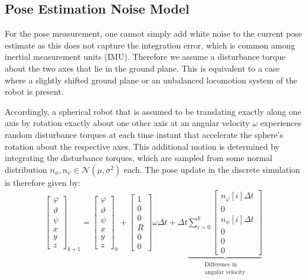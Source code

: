 \subsection{Pose Estimation Noise Model} 

For the pose measurement, one cannot simply add white noise to the current pose estimate as this does not capture the integration error, which is common among inertial measurement units (IMU). 
Therefore we assume a disturbance torque about the two axes that lie in the ground plane. 
This is equivalent to a case where a slightly shifted ground plane or an unbalanced locomotion system of the robot is present.  

Accordingly, a spherical robot that is assumed to be translating exactly along one axis by rotation exactly about one other axis at an angular velocity $\omega$  experiences random disturbance torques at each time instant that accelerate the sphere's rotation about the respective axes. 
This additional motion is determined by integrating the disturbance torques, which are sampled from some normal distribution $n_\phi, n_\psi \in \mathcal{N}(\mu,\sigma^2)$ each.  
The pose update in the discrete simulation is therefore given by: 
\begin{align}
	\begin{bmatrix}\varphi\\\vartheta\\\psi\\x\\y\\z\end{bmatrix}_{k+1} = 
	\begin{bmatrix}\varphi\\\vartheta\\\psi\\x\\y\\z\end{bmatrix}_{k} 
	+ \begin{bmatrix}1\\0\\0\\R\\0\\0\end{bmatrix}\omega \Delta t  + \Delta t \underbrace{\sum_{i = 0}^k \begin{bmatrix}n_\varphi[i] \Delta t\\0\\n_\psi[i]\Delta t\\0\\0\\0\end{bmatrix}}_{\substack{\text{Difference in}\\\text{angular velocity}}}
\end{align}

